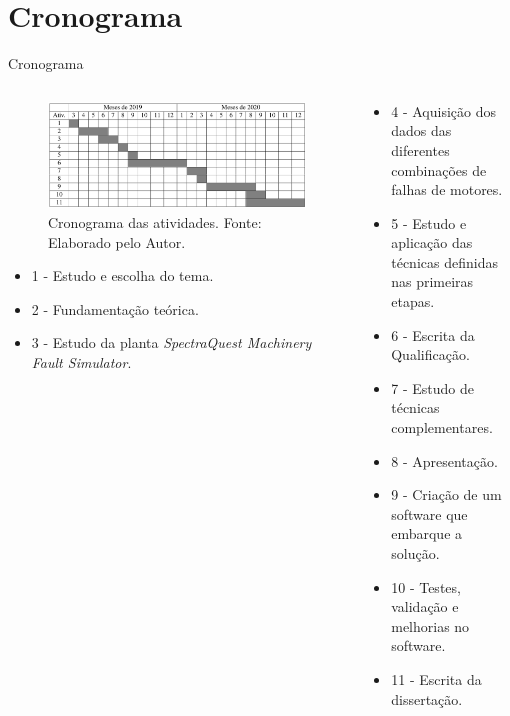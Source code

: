 \documentclass[aspectratio=169]{beamer}
\begin{document}

\section{Cronograma}
\begin{frame}{Cronograma}
	\begin{columns}
    	\begin{column}{0.50\textwidth}
			\begin{figure}[HT]
				\begin{center}
					\includegraphics[scale=.18]{cronograma.png}
					\caption{Cronograma das atividades. \newline
					Fonte: Elaborado pelo Autor.} 
					\label{fig:crono}
				\end{center}
			\end{figure}
			\begin{itemize}
				\item 1 - Estudo e escolha do tema.
				\item 2 - Fundamentação teórica.
				\item 3 - Estudo da planta \textit{SpectraQuest Machinery Fault Simulator}.
			\end{itemize}		
     	\end{column}
		
		\begin{column}{0.5\textwidth}
			\begin{itemize}
				\item 4 - Aquisição dos dados das diferentes combinações de falhas de motores.
				\item 5 - Estudo e aplicação das técnicas definidas nas primeiras etapas.
				\item 6 - Escrita da Qualificação.
				\item 7 - Estudo de técnicas complementares.
				\item 8 - Apresentação.
				\item 9 - Criação de um software que embarque a solução.
				\item 10 - Testes, validação e \newline
				melhorias no software.
				\item 11 - Escrita da dissertação.
			\end{itemize}		
	 	\end{column}
	 \end{columns}
\end{frame}
\end{document}
